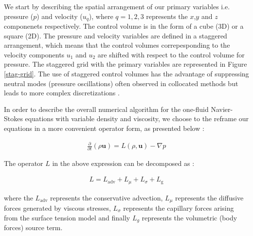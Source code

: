 We start by describing the spatial arrangement of our
primary variables i.e. pressure ($p$) and velocity ($u_q$),
where $q = 1,2,3$ represents the $x$,$y$ and $z$ componenets respectively.
The control volume is in the form of a cube (3D) or a square (2D). 
The pressure and velocity variables are defined in a staggered arrangement, 
which means that the control volumes correpesponding to the velocity components 
$u_1$ and $u_2$ are shifted with respect to the control volume for pressure.
The staggered grid with the primary variables are represented in Figure \ref{stag-grid}.
The use of staggered control volumes has the advantage of
suppressing neutral modes (pressure oscillations) often observed in 
collocated methods but leads to more complex discretizations 
. 

In order to describe the overall numerical algorithm for the one-fluid 
Navier-Stokes equations with variable density and viscosity, 
we choose to the reframe our equations in a more convenient operator form, as presented below : 

\begin{align}
   \frac{\partial}{\partial t} \left( \rho \boldsymbol{u} \right) = L\left( \rho,\boldsymbol{u} \right) - \nabla p
\end{align}

The operator $L$ in the above expression can be decomposed as : 

\begin{align}
	L = L_{\textrm{adv}} + L_{\mu} + L_{\sigma} + L_{\textrm{g}} 
   \label{opr}
\end{align}

where the $L_{\textrm{adv}}$ represents the conservative advection, 
$L_{\mu}$ represents the diffusive forces generated by viscous stresses,
$L_{\sigma}$ represents the capillary forces arising from the surface tension model
and finally $L_{g}$ represents the volumetric (body forces) source term. 


